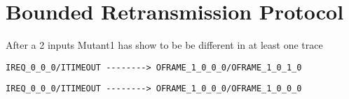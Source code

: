 \documentclass[11pt,a4paper]{article}
\begin{document}
\section{Bounded Retransmission Protocol}


After a 2 inputs Mutant1 has show to be be different in at least one trace

\begin{verbatim}
IREQ_0_0_0/ITIMEOUT --------> OFRAME_1_0_0_0/OFRAME_1_0_1_0
\end{verbatim}
\begin{verbatim}
IREQ_0_0_0/ITIMEOUT --------> OFRAME_1_0_0_0/OFRAME_1_0_0_0
\end{verbatim}





\end{document}
